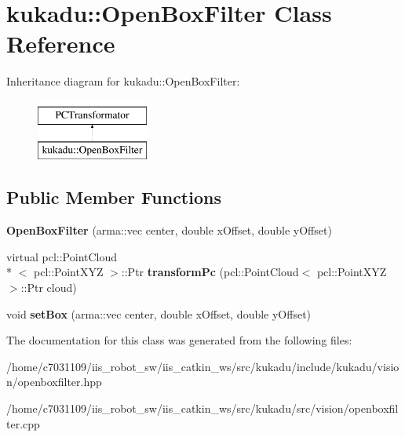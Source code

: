 \hypertarget{classkukadu_1_1OpenBoxFilter}{\section{kukadu\-:\-:Open\-Box\-Filter Class Reference}
\label{classkukadu_1_1OpenBoxFilter}
}
Inheritance diagram for kukadu\-:\-:Open\-Box\-Filter\-:\begin{figure}[H]
\begin{center}
\leavevmode
\includegraphics[height=2.000000cm]{classkukadu_1_1OpenBoxFilter}
\end{center}
\end{figure}
\subsection*{Public Member Functions}
\begin{DoxyCompactItemize}
\item 
\hypertarget{classkukadu_1_1OpenBoxFilter_a6e0307a97b104f1a14305502f6d16c18}{{\bfseries Open\-Box\-Filter} (arma\-::vec center, double x\-Offset, double y\-Offset)}\label{classkukadu_1_1OpenBoxFilter_a6e0307a97b104f1a14305502f6d16c18}

\item 
\hypertarget{classkukadu_1_1OpenBoxFilter_ab50cb129fdd531fa3033aa5de741a64c}{virtual pcl\-::\-Point\-Cloud\\*
$<$ pcl\-::\-Point\-X\-Y\-Z $>$\-::Ptr {\bfseries transform\-Pc} (pcl\-::\-Point\-Cloud$<$ pcl\-::\-Point\-X\-Y\-Z $>$\-::Ptr cloud)}\label{classkukadu_1_1OpenBoxFilter_ab50cb129fdd531fa3033aa5de741a64c}

\item 
\hypertarget{classkukadu_1_1OpenBoxFilter_a755530c495d178e1c4ec5a46df718aac}{void {\bfseries set\-Box} (arma\-::vec center, double x\-Offset, double y\-Offset)}\label{classkukadu_1_1OpenBoxFilter_a755530c495d178e1c4ec5a46df718aac}

\end{DoxyCompactItemize}


The documentation for this class was generated from the following files\-:\begin{DoxyCompactItemize}
\item 
/home/c7031109/iis\-\_\-robot\-\_\-sw/iis\-\_\-catkin\-\_\-ws/src/kukadu/include/kukadu/vision/openboxfilter.\-hpp\item 
/home/c7031109/iis\-\_\-robot\-\_\-sw/iis\-\_\-catkin\-\_\-ws/src/kukadu/src/vision/openboxfilter.\-cpp\end{DoxyCompactItemize}

